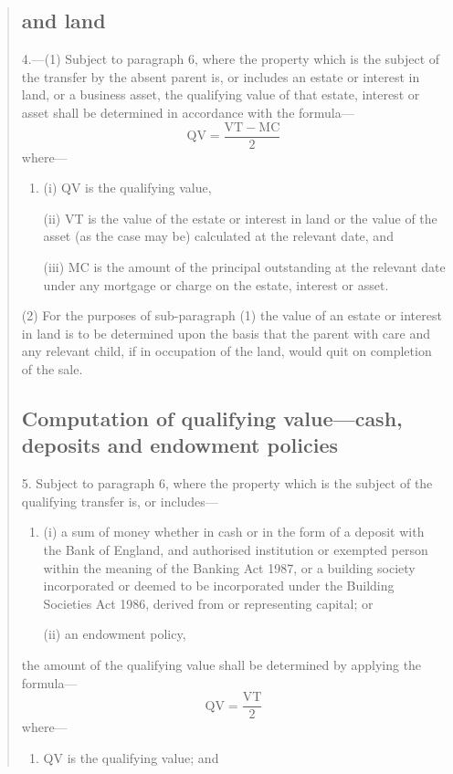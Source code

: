 \documentclass[a4paper]{article}
\begin{document}
\begin{quotation}
\subsection*{ and land}

4.—(1) Subject to paragraph 6, where the property which is the subject of the transfer by the absent parent is, or includes an estate or interest in land, or a business asset, the qualifying value of that estate, interest or asset shall be determined in accordance with the formula—
\[\mathrm{QV} = \frac{\mathrm{VT} - \mathrm{MC}}{2}\]
where—
\begin{enumerate}\item[]
(i) QV is the qualifying value,

(ii) VT is the value of the estate or interest in land or the value of the asset (as the case may be) calculated at the relevant date, and

(iii) MC is the amount of the principal outstanding at the relevant date under any mortgage or charge on the estate, interest or asset.
\end{enumerate}

(2) For the purposes of sub-paragraph (1) the value of an estate or interest in land is to be determined upon the basis that the parent with care and any relevant child, if in occupation of the land, would quit on completion of the sale.

\subsection*{Computation of qualifying value—cash, deposits and endowment policies}

5.  Subject to paragraph 6, where the property which is the subject of the qualifying transfer is, or includes—
\begin{enumerate}\item[]
(i) a sum of money whether in cash or in the form of a deposit with the Bank of England, and authorised institution or exempted person within the meaning of the Banking Act 1987, or a building society incorporated or deemed to be incorporated under the Building Societies Act 1986, derived from or representing capital; or

(ii) an endowment policy,
\end{enumerate}
the amount of the qualifying value shall be determined by applying the formula—
\[ \mathrm{QV} = \frac{\mathrm{VT}}{2}\]
where—
\begin{enumerate}\item[]
QV is the qualifying value; and


\end{enumerate}
\end{quotation}
\end{document}
